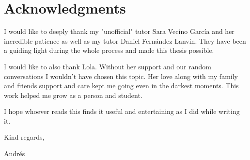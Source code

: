 \chapter{Acknowledgments}
\label{chap:acknowledgments}
I would like to deeply thank my "unofficial" tutor Sara Vecino García and her incredible patience
as well as my tutor Daniel Fernández Lanvin. They have been a guiding light during the whole process and made this
thesis possible.

\vspace{0.5cm}
I would like to also thank Lola. Without her support and our random conversations I wouldn't have chosen this topic.
Her love along with my family and friends support and care kept me going even in the darkest moments. This work helped me grow
as a person and student. 
\vspace{1cm}

I hope whoever reads this finds it useful and entertaining as I did while writing it.
\vspace{0.5cm}

Kind regards,

Andrés 